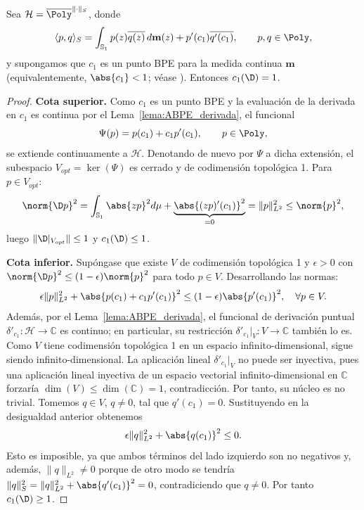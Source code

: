 \begin{thm}
	\label{thm:c2_punto}
	Sea $\mathcal{H} = \overline{\Poly}^{\|\cdot\|_S}$, donde
	\begin{equation}
		\langle p, q \rangle_S = \int_{\mathbb{S}_1} p(z)\overline{q(z)} \, d\mathbf{m}(z) + p'(c_1)\overline{q'(c_1)}, \qquad p,q \in \Poly,
	\end{equation}
	y supongamos que $c_1$ es un punto BPE para la medida continua $\mathbf m$ (equivalentemente, $\abs{c_1}<1$; véase \cite{duren1970theory}). Entonces $c_1(\D) = 1$.
\end{thm}

\begin{proof}
	\textbf{Cota superior.} Como $c_1$ es un punto BPE y la evaluación de la derivada en $c_1$ es continua por el Lema~\ref{lema:ABPE_derivada}, el funcional
	\[
		\Psi(p) = p(c_1) + c_1 p'(c_1), \qquad p \in \Poly,
	\]
	se extiende continuamente a $\mathcal{H}$. Denotando de nuevo por $\Psi$ a dicha extensión, el subespacio $V_{opt} = \ker(\Psi)$ es cerrado y de codimensión topológica 1. Para $p \in V_{opt}$:
	\[
		\norm{\D p}^2 = \int_{\mathbb{S}_1} \abs{zp}^2 d\mu + \underbrace{\abs{(zp)'(c_1)}^2}_{=0} = \|p\|_{L^2}^2 \le \norm{p}^2,
	\]
	luego $\|\D|_{V_{opt}}\| \le 1$ y $c_1(\D) \le 1$.

	\textbf{Cota inferior.} Supóngase que existe $V$ de codimensión topológica 1 y $\epsilon > 0$ con $\norm{\D p}^2 \le (1-\epsilon)\norm{p}^2$ para todo $p \in V$. Desarrollando las normas:
	\[
		\epsilon \|p\|_{L^2}^2 + \abs{p(c_1) + c_1 p'(c_1)}^2 \le (1-\epsilon)\abs{p'(c_1)}^2, \quad \forall p \in V.
	\]
	Además, por el Lema~\ref{lema:ABPE_derivada}, el funcional de derivación puntual $\delta'_{c_1}: \mathcal{H} \to \mathbb{C}$ es continuo; en particular, su restricción $\delta'_{c_1}|_V : V \to \mathbb{C}$ también lo es. Como $V$ tiene codimensión topológica 1 en un espacio infinito-dimensional, sigue siendo infinito-dimensional. La aplicación lineal $\delta'_{c_1}|_V$ no puede ser inyectiva, pues una aplicación lineal inyectiva de un espacio vectorial infinito-dimensional en $\mathbb{C}$ forzaría $\dim(V) \leq \dim(\mathbb{C}) = 1$, contradicción. Por tanto, su núcleo es no trivial. Tomemos $q \in V$, $q \neq 0$, tal que $q'(c_1)=0$. Sustituyendo en la desigualdad anterior obtenemos
	\[
		\epsilon \|q\|_{L^2}^2 + \abs{q(c_1)}^2 \le 0.
	\]
	Esto es imposible, ya que ambos términos del lado izquierdo son no negativos y, además, $\|q\|_{L^2} \neq 0$ porque de otro modo se tendría $\|q\|_S^2 = \|q\|_{L^2}^2 + \abs{q'(c_1)}^2 = 0$, contradiciendo que $q \neq 0$. Por tanto $c_1(\D) \ge 1$.
\end{proof}

